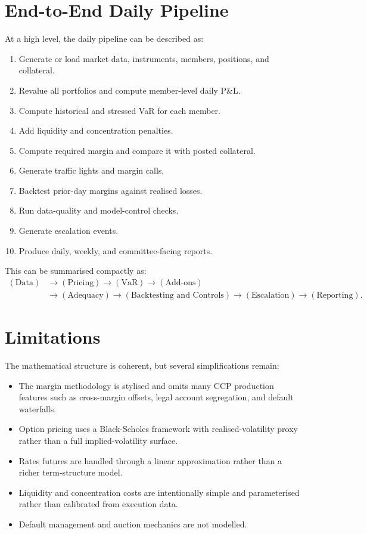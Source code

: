 \documentclass[11pt]{article}
\begin{document}
\section{End-to-End Daily Pipeline}

At a high level, the daily pipeline can be described as:

\begin{enumerate}
    \item Generate or load market data, instruments, members, positions, and collateral.
    \item Revalue all portfolios and compute member-level daily P\&L.
    \item Compute historical and stressed VaR for each member.
    \item Add liquidity and concentration penalties.
    \item Compute required margin and compare it with posted collateral.
    \item Generate traffic lights and margin calls.
    \item Backtest prior-day margins against realised losses.
    \item Run data-quality and model-control checks.
    \item Generate escalation events.
    \item Produce daily, weekly, and committee-facing reports.
\end{enumerate}

This can be summarised compactly as:
\begin{align*}
(\text{Data})
&\to
(\text{Pricing})
\to
(\text{VaR})
\to
(\text{Add-ons})\\
&\to
(\text{Adequacy})
\to
(\text{Backtesting and Controls})
\to
(\text{Escalation})
\to
(\text{Reporting}).
\end{align*}

\section{Limitations}

The mathematical structure is coherent, but several simplifications remain:

\begin{itemize}
    \item The margin methodology is stylised and omits many CCP production features such as cross-margin offsets, legal account segregation, and default waterfalls.
    \item Option pricing uses a Black-Scholes framework with realised-volatility proxy rather than a full implied-volatility surface.
    \item Rates futures are handled through a linear approximation rather than a richer term-structure model.
    \item Liquidity and concentration costs are intentionally simple and parameterised rather than calibrated from execution data.
    \item Default management and auction mechanics are not modelled.
\end{itemize}
\end{document}
